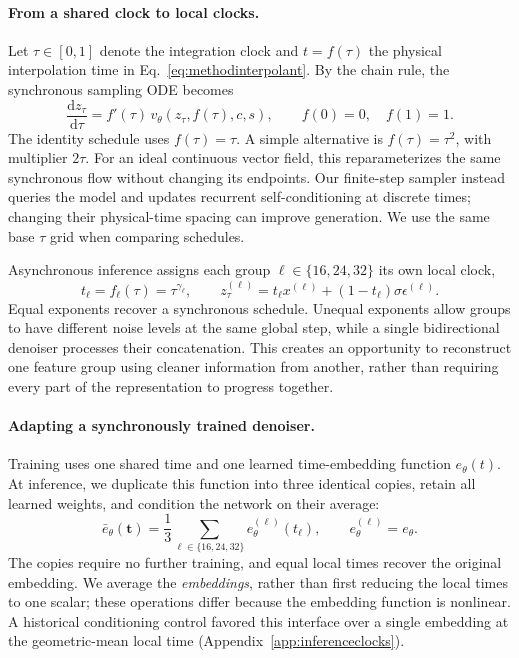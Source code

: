 \paragraph{From a shared clock to local clocks.}
Let $\tau\in[0,1]$ denote the integration clock and $t=f(\tau)$ the physical interpolation time in Eq.~\eqref{eq:methodinterpolant}. By the chain rule, the synchronous sampling ODE becomes
\begin{equation}
 \frac{\mathrm dz_\tau}{\mathrm d\tau}
 = f'(\tau)\,v_\theta(z_\tau,f(\tau),c,s),
 \qquad f(0)=0,\quad f(1)=1.
 \label{eq:sharedclock}
\end{equation}
The identity schedule uses $f(\tau)=\tau$. A simple alternative is $f(\tau)=\tau^2$, with multiplier $2\tau$. For an ideal continuous vector field, this reparameterizes the same synchronous flow without changing its endpoints. Our finite-step sampler instead queries the model and updates recurrent self-conditioning at discrete times; changing their physical-time spacing can improve generation. We use the same base $\tau$ grid when comparing schedules.

Asynchronous inference assigns each group $\ell\in\{16,24,32\}$ its own local clock,
\begin{equation}
 t_\ell=f_\ell(\tau)=\tau^{\gamma_\ell},
 \qquad
 z_\tau^{(\ell)}=t_\ell x^{(\ell)}+(1-t_\ell)\sigma\epsilon^{(\ell)}.
 \label{eq:localclocks}
\end{equation}
Equal exponents recover a synchronous schedule. Unequal exponents allow groups to have different noise levels at the same global step, while a single bidirectional denoiser processes their concatenation. This creates an opportunity to reconstruct one feature group using cleaner information from another, rather than requiring every part of the representation to progress together.

\paragraph{Adapting a synchronously trained denoiser.}
Training uses one shared time and one learned time-embedding function $e_\theta(t)$. At inference, we duplicate this function into three identical copies, retain all learned weights, and condition the network on their average:
\begin{equation}
 \bar e_\theta(\bm t)
 =\frac{1}{3}\sum_{\ell\in\{16,24,32\}}e_\theta^{(\ell)}(t_\ell),
 \qquad e_\theta^{(\ell)}=e_\theta.
 \label{eq:asynctimeembedding}
\end{equation}
The copies require no further training, and equal local times recover the original embedding. We average the \emph{embeddings}, rather than first reducing the local times to one scalar; these operations differ because the embedding function is nonlinear. A historical conditioning control favored this interface over a single embedding at the geometric-mean local time (Appendix~\ref{app:inferenceclocks}).

